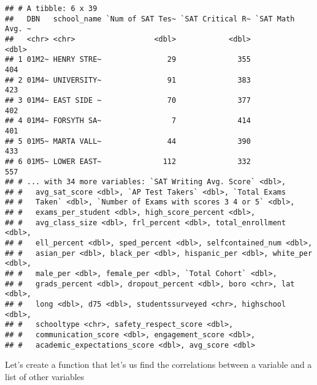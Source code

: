 \documentclass[]{article}
\begin{document}
\begin{verbatim}
## # A tibble: 6 x 39
##   DBN   school_name `Num of SAT Tes~ `SAT Critical R~ `SAT Math Avg. ~
##   <chr> <chr>                  <dbl>            <dbl>            <dbl>
## 1 01M2~ HENRY STRE~               29              355              404
## 2 01M4~ UNIVERSITY~               91              383              423
## 3 01M4~ EAST SIDE ~               70              377              402
## 4 01M4~ FORSYTH SA~                7              414              401
## 5 01M5~ MARTA VALL~               44              390              433
## 6 01M5~ LOWER EAST~              112              332              557
## # ... with 34 more variables: `SAT Writing Avg. Score` <dbl>,
## #   avg_sat_score <dbl>, `AP Test Takers` <dbl>, `Total Exams
## #   Taken` <dbl>, `Number of Exams with scores 3 4 or 5` <dbl>,
## #   exams_per_student <dbl>, high_score_percent <dbl>,
## #   avg_class_size <dbl>, frl_percent <dbl>, total_enrollment <dbl>,
## #   ell_percent <dbl>, sped_percent <dbl>, selfcontained_num <dbl>,
## #   asian_per <dbl>, black_per <dbl>, hispanic_per <dbl>, white_per <dbl>,
## #   male_per <dbl>, female_per <dbl>, `Total Cohort` <dbl>,
## #   grads_percent <dbl>, dropout_percent <dbl>, boro <chr>, lat <dbl>,
## #   long <dbl>, d75 <dbl>, studentssurveyed <chr>, highschool <dbl>,
## #   schooltype <chr>, safety_respect_score <dbl>,
## #   communication_score <dbl>, engagement_score <dbl>,
## #   academic_expectations_score <dbl>, avg_score <dbl>
\end{verbatim}

Let's create a function that let's us find the correlations between a
variable and a list of other variables
\end{document}
